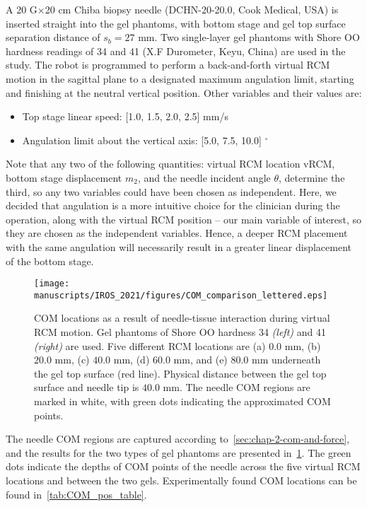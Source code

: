 A 20 G$\times$20 cm Chiba biopsy needle (DCHN-20-20.0, Cook Medical, USA) is inserted straight into the gel phantoms, with bottom stage and gel top surface separation distance of $s_b = 27$ mm. Two single-layer gel phantoms with Shore OO hardness readings of 34 and 41 (X.F Durometer, Keyu, China) are used in the study. The robot is programmed to perform a back-and-forth virtual RCM motion in the sagittal plane to a designated maximum angulation limit, starting and finishing at the neutral vertical position. Other variables and their values are:

\begin{itemize}
  \item Top stage linear speed: [1.0, 1.5, 2.0, 2.5] mm/s
  \item Angulation limit about the vertical axis: [5.0, 7.5, 10.0] $^\circ$
\end{itemize}


Note that any two of the following quantities: virtual RCM location vRCM, bottom stage displacement $m_2$, and the needle incident angle $\theta$, determine the third, so any two variables could have been chosen as independent. Here, we decided that angulation is a more intuitive choice for the clinician during the operation, along with the virtual RCM position -- our main variable of interest, so they are chosen as the independent variables. Hence, a deeper RCM placement with the same angulation will necessarily result in a greater linear displacement of the bottom stage.

\begin{figure}[h]
  \centering
  \texttt{[image: manuscripts/IROS\_2021/figures/COM\_comparison\_lettered.eps]}
  \caption{COM locations as a result of needle-tissue interaction during virtual RCM motion. Gel phantoms of Shore OO hardness 34 \textit{(left)} and 41 \textit{(right)} are used. Five different RCM locations are (a) $0.0$ mm, (b) $20.0$ mm, (c) $40.0$ mm, (d) $60.0$ mm, and (e) $80.0$ mm underneath the gel top surface (red line). Physical distance between the gel top surface and needle tip is $40.0$ mm. The needle COM regions are marked in white, with green dots indicating the approximated COM points.}
  \label{fig:com_compare}
\end{figure}

The needle COM regions are captured according to~\cref{sec:chap-2-com-and-force}, and the results for the two types of gel phantoms are presented in~\cref{fig:com_compare}. The green dots indicate the depths of COM points of the needle across the five virtual RCM locations and between the two gels. Experimentally found COM locations can be found in~\cref{tab:COM_pos_table}.


